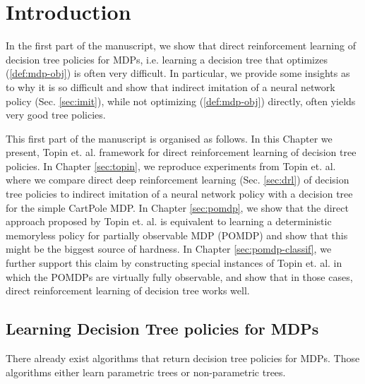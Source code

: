 \chapter{Introduction}
In the first part of the manuscript, we show that direct reinforcement learning of decision tree policies for MDPs, i.e. learning a decision tree that optimizes (\ref{def:mdp-obj}) is often very difficult.
In particular, we provide some insights as to why it is so difficult and show that indirect imitation of a neural network policy (Sec. \ref{sec:imit}), while not optimizing (\ref{def:mdp-obj}) directly, often yields very good tree policies.

This first part of the manuscript is organised as follows.
In this Chapter we present, Topin et. al. \cite{topin2021iterative} framework for direct reinforcement learning of decision tree policies.
In Chapter \ref{sec:topin}, we reproduce experiments from Topin et. al. where we compare direct deep reinforcement learning (Sec. \ref{sec:drl}) of decision tree policies to indirect imitation of a neural network policy with a decision tree for the simple CartPole MDP.
In Chapter \ref{sec:pomdp}, we show that the direct approach proposed by Topin et. al. is equivalent to learning a deterministic memoryless policy for partially observable MDP (POMDP)\cite{POMDP,chap2} and show that this might be the biggest source of hardness.
In Chapter \ref{sec:pomdp-classif}, we further support this claim by constructing special instances of Topin et. al. in which the POMDPs are virtually fully observable, and show that in those cases, direct reinforcement learning of decision tree works well.  

\section{Learning Decision Tree policies for MDPs}
There already exist algorithms that return decision tree policies for MDPs.
Those algorithms either learn parametric trees or non-parametric trees.

